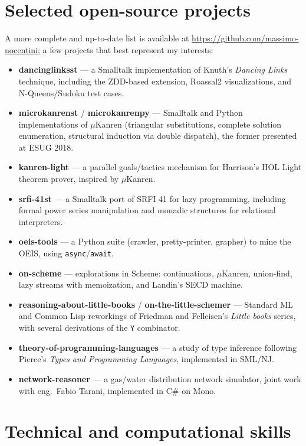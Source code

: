 \documentclass[11pt,a4paper]{article}
\begin{document}
\section*{Selected open-source projects}

A more complete and up-to-date list is available at \url{https://github.com/massimo-nocentini}; a few projects that best represent my interests:

\begin{itemize}[leftmargin=1.4em,itemsep=0.3em]
\item \textbf{dancinglinksst} --- a Smalltalk implementation of Knuth's \emph{Dancing Links} technique, including the ZDD-based extension, Roassal2 visualizations, and N-Queens/Sudoku test cases.
\item \textbf{microkanrenst} / \textbf{microkanrenpy} --- Smalltalk and Python implementations of $\mu$Kanren (triangular substitutions, complete solution enumeration, structural induction via double dispatch), the former presented at ESUG 2018.
\item \textbf{kanren-light} --- a parallel goals/tactics mechanism for Harrison's HOL Light theorem prover, inspired by $\mu$Kanren.
\item \textbf{srfi-41st} --- a Smalltalk port of SRFI 41 for lazy programming, including formal power series manipulation and monadic structures for relational interpreters.
\item \textbf{oeis-tools} --- a Python suite (crawler, pretty-printer, grapher) to mine the OEIS, using \texttt{async}/\texttt{await}.
\item \textbf{on-scheme} --- explorations in Scheme: continuations, $\mu$Kanren, union-find, lazy streams with memoization, and Landin's SECD machine.
\item \textbf{reasoning-about-little-books} / \textbf{on-the-little-schemer} --- Standard ML and Common Lisp reworkings of Friedman and Felleisen's \emph{Little books} series, with several derivations of the \texttt{Y} combinator.
\item \textbf{theory-of-programming-languages} --- a study of type inference following Pierce's \emph{Types and Programming Languages}, implemented in SML/NJ.
\item \textbf{network-reasoner} --- a gas/water distribution network simulator, joint work with eng.\ Fabio Tarani, implemented in C\# on Mono.
\end{itemize}

\section*{Technical and computational skills}
\end{document}
